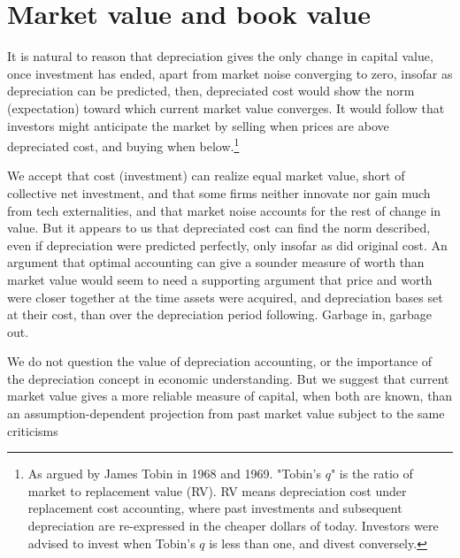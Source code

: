 \section{Market value and book value}

It is natural to reason that depreciation gives the only change in capital value, once investment has ended, apart from market noise converging to zero, insofar as depreciation can be predicted, then, depreciated cost would show the norm (expectation) toward which current market value converges. It would follow that investors might anticipate the market by selling when prices are above depreciated cost, and buying when below.\footnote{As argued by James Tobin in 1968 and 1969. "Tobin's \(q\)" is the ratio of market to replacement value (RV). RV means depreciation cost under replacement cost accounting, where past investments and subsequent depreciation are re-expressed in the cheaper dollars of today. Investors were advised to invest when Tobin's \(q\) is less than one, and divest conversely.}

We accept that cost (investment) can realize equal market value, short of collective net investment, and that some firms neither innovate nor gain much from tech externalities, and that market noise accounts for the rest of change in value. But it appears to us that depreciated cost can find the norm described, even if depreciation were predicted perfectly, only insofar as did original cost. An argument that optimal accounting can give a sounder measure of worth than market value would seem  to need a supporting argument that price and worth were closer together at the time assets were acquired, and depreciation bases set at their cost, than over the depreciation period following. Garbage in, garbage out.

We do not question the value of depreciation accounting, or the importance of the depreciation concept in economic understanding. But we suggest that current market value gives a more reliable measure of capital, when both are known, than an assumption-dependent projection from past market value subject to the same criticisms





